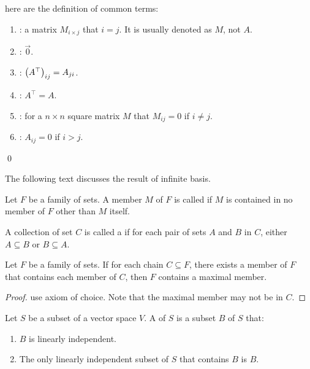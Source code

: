 \begin{definition}
    here are the definition of common terms:
    \begin{enumerate}
        \item {}: a matrix $M_{i \times j}$ that $i = j$. It is usually denoted as $M$, not $A$.
        \item {}: $\vec{0}$.
        \item {}: $\mleft(A^\top\mright)_{ij} = A_{ji}$.
        \item {}: $A^\top = A$.
        \item {}: for a $n \times n$ square matrix $M$ that $M_{ij} = 0$ if $i \neq j$.
        \item {}: $A_{ij} = 0$ if $i > j$.
    \end{enumerate}
    \qed    
\end{definition}



The following text discusses the result of infinite basis.

\begin{definition}
    Let $F$ be a family of sets. A member $M$ of $F$ is called  if $M$ is contained in no member of $F$ other than $M$ itself.
\end{definition}

\begin{definition}
    A collection of set $C$ is called a  if for each pair of sets $A$ and $B$ in $C$, either $A \subseteq B$ or $B \subseteq A$.
\end{definition}

\begin{theorem}
    Let $F$ be a family of sets. If for each chain $C \subseteq F$, there exists a member of $F$ that contains each member of $C$, then $F$ contains a maximal member.    
\end{theorem}

\begin{proof}
    use axiom of choice. Note that the maximal member may not be in $C$.
\end{proof}

\begin{definition}
    Let $S$ be a subset of a vector space $V$. A  of $S$ is a subset $B$ of $S$ that:
    \begin{enumerate}
        \item $B$ is linearly independent.
        \item The only linearly independent subset of $S$ that contains $B$ is $B$.
    \end{enumerate}
\end{definition}

